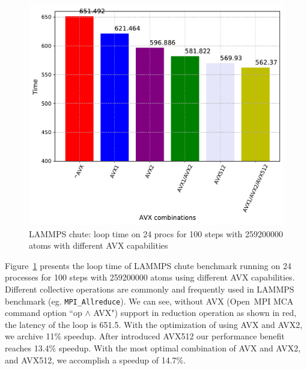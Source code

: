 \documentclass[5p,times,twocolumn]{elsarticle}
\newcommand{\mpifunc}[1]{\lstinline"MPI_#1"\xspace}
\newcommand{\ompi}[0]{Open~MPI\xspace}
\begin{document}
\begin{figure}[h]
    \centering
    \includegraphics[width=\linewidth]{lammps_avx_review.pdf}
    \caption{LAMMPS chute: loop time on 24 procs for 100 steps with 259200000 atoms with different AVX capabilities}
    \label{fig:lammpsavx}
\end{figure}

Figure~\ref{fig:lammpsavx} presents the loop time of LAMMPS chute benchmark running
on 24 processes for 100 steps with 259200000 atoms using different AVX capabilities.
Different collective operations are commonly and frequently used in LAMMPS benchmark (eg. \mpifunc{Allreduce}).
We can see, without AVX (\ompi MCA command option ``op $\wedge$ AVX") support in reduction operation as shown in red, the latency of the loop is 651.5.
With the optimization of using AVX and AVX2, we archive 11\% speedup. After introduced AVX512 our performance
benefit reaches 13.4\% speedup. With the most optimal combination of AVX and AVX2, and AVX512,
we accomplish a speedup of 14.7\%.
\end{document}
